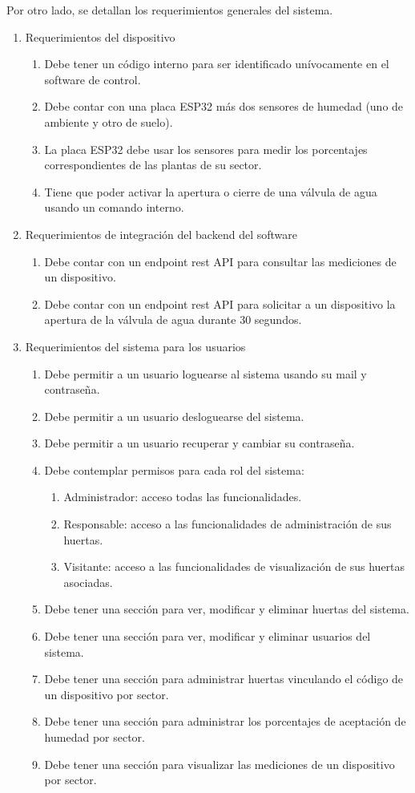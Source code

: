 Por otro lado, se detallan los requerimientos generales del sistema.
\begin{enumerate}
	\item Requerimientos del dispositivo
		\begin{enumerate}
			\item Debe tener un código interno para ser identificado unívocamente en el software de control.
			\item Debe contar con una placa ESP32 más dos sensores de humedad (uno de ambiente y otro de suelo).
			\item La placa ESP32 debe usar los sensores para medir los porcentajes correspondientes de las plantas de su sector. 
			\item Tiene que poder activar la apertura o cierre de una válvula de agua usando un comando interno.
		\end{enumerate}
	
	\item Requerimientos de integración del backend del software
		\begin{enumerate}
			\item Debe contar con un endpoint rest API para consultar las mediciones de un dispositivo.
			\item Debe contar con un endpoint rest API para solicitar a un dispositivo la apertura de la válvula de agua durante 30 segundos.
			\end{enumerate}

	\item Requerimientos del sistema para los usuarios
		\begin{enumerate}
			\item Debe permitir a un usuario loguearse al sistema usando su mail y contraseña.
			\item Debe permitir a un usuario desloguearse del sistema.
			\item Debe permitir a un usuario recuperar y cambiar su contraseña.
			\item Debe contemplar permisos para cada rol del sistema:
			\begin{enumerate}
			\item Administrador: acceso todas las funcionalidades.
			\item Responsable: acceso a las funcionalidades de administración de sus huertas.
			\item Visitante: acceso a las funcionalidades de visualización de sus huertas asociadas.
			\end{enumerate}
			\item Debe tener una sección para ver, modificar y eliminar huertas del sistema.
			\item Debe tener una sección para ver, modificar y eliminar usuarios del sistema.
			\item Debe tener una sección para administrar huertas vinculando el código de un dispositivo por sector.
			\item Debe tener una sección para administrar los porcentajes de aceptación de humedad por sector.
			\item Debe tener una sección para visualizar las mediciones de un dispositivo por sector.
		\end{enumerate}		
\end{enumerate}
